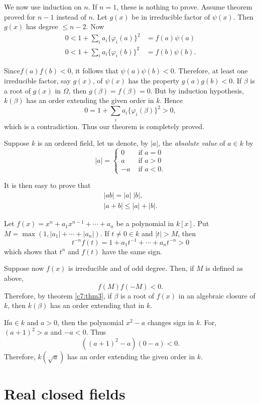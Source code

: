 We now use induction on $n$. If $n=1$, these is nothing to
prove. Assume theorem proved for $n-1$ instead of $n$. Let $g(x)$ be
in irreducible factor of $\psi(x)$. Then $g(x)$ has degree $\leq
n-2$. Now
\begin{align*}
0<1 + \sum_i a_i \{\varphi_i(a)\}^2 & = f(a) \psi (a)\\
0<1 + \sum_i a_i \{\varphi_i (b)\}^2 & = f(b) \psi (b).
\end{align*}

Since\pageoriginale $f(a) f(b) <0$, it follows that $\psi(a)
\psi(b)<0$. Therefore, 
at least one irreducible factor, say $g(x)$, of $\psi(x)$ has the
property $g(a)g(b)<0$. If $\beta$ is a root of $g(x)$ in $\Omega$,
then $g(\beta) = f(\beta) =0$. But by induction hypothesis, $k(\beta)$
has an order extending the given order in $k$. Hence
$$
0=1+\sum_i a_i \{\varphi_i (\beta)\}^2 >0,
$$
which is a contradiction. Thus our theorem is completely proved.

Suppose $k$ is an ordered field, let us denote, by $|a|$, the
\textit{absolute value} of $a\in k$ by 
$$
|a|=
\begin{cases}
0 & \text{ if } a=0\\
a & \text{ if } a >0\\
-a & \text{ if } a<0.
\end{cases}
$$

It is then easy to prove that 
\begin{gather*}
|ab| = |a| \; |b|,\\
|a+b| \leq |a| + |b|.
\end{gather*}

Let $f(x) = x^n +a_1 x^{n-1} + \cdots + a_n$ be a polynomial in
$k[x]$. Put $M=\max(1, |a_1| + \cdots + |a_n|)$. If $t\neq 0 \in k$
and $|t|>M$, then 
$$
t^{-n} f(t) = 1+ a_1 t^{-1} + \cdots + a_n t^{-n} >0
$$
which shows that $t^n$ and $f(t)$ have the same sign.

Suppose now $f(x)$ is irreducible and of odd degree. Then, if $M$ is
defined as above,
$$
f(M) f(-M) < 0. 
$$
Therefore, by theorem \ref{c7:thm3}, if $\beta$ is a root of $f(x)$ in an
algebraic closure of $k$, then $k(\beta)$ has an order extending that
in $k$.

If\pageoriginale $a \in k$ and $a>0$, then the polynomial $x^2-a$
changes sign in $k$. For, $(a+1)^2>a$ and $-a<0$. Thus 
$$
((a+1)^2 -a) (0-a) <0.
$$
Therefore, $k(\sqrt{a})$ has an order extending the given order in
$k$.


\section{Real closed fields}\label{c7:s3}%

